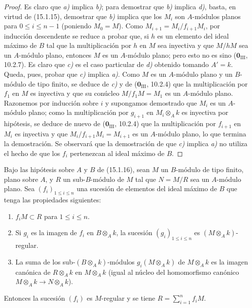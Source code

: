 \begin{proof}
Es claro que \emph{a)} implica \emph{b)}; para demostrar que \emph{b)} implica \emph{d)}, basta, en virtud
de (15.1.15), demostrar que \emph{b)} implica que los $M_i$ son $A$-módulos planos
para $0\leq i\leq n-1$ (poniendo $M_0=M$). Como
$M_{i+1}=M_i/f_{i+1}M_i$, por inducción descendente se reduce a probar que,
si $h$ es un elemento del ideal máximo de $B$ tal que la multiplicación por
$h$ en $M$ sea inyectiva y que $M/hM$ sea un $A$-módulo plano, entonces $M$
es un $A$-módulo plano; pero esto no es sino
($\mathbf{0}_{\mathrm{III}}$, 10.2.7). Es claro que \emph{c)} es el caso particular de \emph{d)}
obtenido tomando $A'=k$. Queda, pues, probar que \emph{c)} implica \emph{a)}. Como $M$ es un
$A$-módulo plano y un $B$-módulo de tipo finito, se deduce de \emph{c)} y de
($\mathbf{0}_{\mathrm{III}}$, 10.2.4) que la multiplicación por $f_1$ en $M$ es
inyectiva y que su conúcleo $M/f_1M=M_1$ es un $A$-módulo plano. Razonemos por
inducción sobre $i$ y supongamos demostrado que $M_i$ es un $A$-módulo plano;
como la multiplicación por $g_{i+1}$ en $M_i\otimes_A k$ es inyectiva por
hipótesis, se deduce de nuevo de ($\mathbf{0}_{\mathrm{III}}$, 10.2.4) que la
multiplicación por $f_{i+1}$ en $M_i$ es inyectiva y que
$M_i/f_{i+1}M_i=M_{i+1}$ es un $A$-módulo plano, lo que termina la
demostración. Se observará que la demostración de que \emph{c)} implica \emph{a)} no utiliza
el hecho de que los $f_i$ pertenezcan al ideal máximo de $B$.
\end{proof}

\begin{corollary}[15.1.17]
\label{0.15.1.17-fr}
Bajo las hipótesis sobre $A$ y $B$ de \textup{(15.1.16)}, sean $M$ un $B$-módulo de
tipo finito, plano sobre $A$, y $R$ un sub-$B$-módulo de $M$ tal que $N=M/R$
sea un $A$-módulo plano. Sea $(f_i)_{1\leq i\leq n}$ una sucesión de elementos
del ideal máximo de $B$ que tenga las propiedades siguientes:
\begin{enumerate}
  \item[\textup{(i)}] $f_iM\subset R$ para $1\leq i\leq n$.
  \item[\textup{(ii)}] Si $g_i$ es la imagen de $f_i$ en $B\otimes_A k$, la sucesión
  $(g_i)_{1\leq i\leq n}$ es $(M\otimes_A k)$-regular.
  \item[\textup{(iii)}] La suma de los sub-$(B\otimes_A k)$-módulos
  $g_i(M\otimes_A k)$ de $M\otimes_A k$ es la imagen canónica de
  $R\otimes_A k$ en $M\otimes_A k$ (igual al núcleo del homomorfismo canónico
  $M\otimes_A k\to N\otimes_A k$).
\end{enumerate}
Entonces la sucesión $(f_i)$ es $M$-regular y se tiene
$R=\sum_{i=1}^n f_iM$.
\end{corollary}

